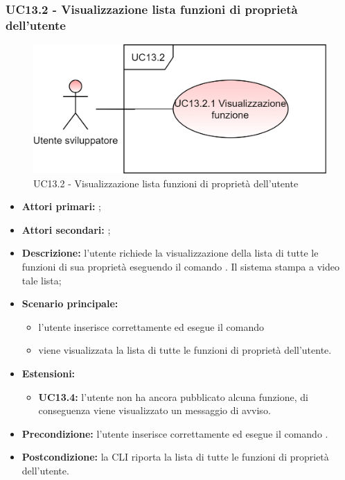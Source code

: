 \subsubsection{UC13.2 - Visualizzazione lista funzioni di proprietà dell’utente}
\begin{figure}[h]
	\centering
	\includegraphics[scale=\ucs]{./res/img/UC13-2.png}
	\caption {UC13.2 - Visualizzazione lista funzioni di proprietà dell’utente}
\end{figure}
\begin{itemize}
	\item \textbf{Attori primari:} \us{};
	\item \textbf{Attori secondari:} \re{};
	\item \textbf{Descrizione:} l’utente richiede la visualizzazione della lista di tutte le funzioni di sua proprietà eseguendo il comando \plista{}. Il sistema stampa a video tale lista;
	\item \textbf{Scenario principale:} 
	\begin{itemize}
		\item l’utente inserisce correttamente ed esegue il comando \plista{}  
		\item viene visualizzata la lista di tutte le funzioni di proprietà dell’utente. 
	\end{itemize}
	\item \textbf{Estensioni:} 
	\begin{itemize}
		\item \textbf{UC13.4:} l’utente non ha ancora pubblicato alcuna funzione, di conseguenza viene visualizzato un messaggio di avviso. 
	\end{itemize}
	\item \textbf{Precondizione:} l'utente inserisce correttamente ed esegue il comando \plista{}.
	\item \textbf{Postcondizione:} la CLI riporta la lista di tutte le funzioni di proprietà dell’utente. 
\end{itemize}